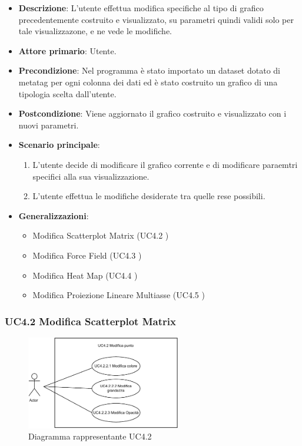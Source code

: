 \begin{itemize}
    \item \textbf{Descrizione}: L’utente effettua modifica specifiche al tipo di grafico precedentemente costruito e visualizzato, 
                                su parametri quindi validi solo per tale visualizzazone, e ne vede le modifiche.
	
    \item \textbf{Attore primario}: Utente.
    
    \item \textbf{Precondizione}:   Nel programma è stato importato un dataset dotato di metatag per ogni
                                    colonna dei dati ed è stato costruito un grafico di una tipologia scelta dall'utente.

    \item \textbf{Postcondizione}:  Viene aggiornato il grafico costruito e visualizzato con i nuovi parametri.

	\item \textbf{Scenario principale}:
		\begin{enumerate}
			\item L'utente decide di modificare il grafico corrente e di modificare paraemtri specifici alla sua visualizzazione.
			\item L'utente effettua le modifiche desiderate tra quelle rese possibili.
        \end{enumerate}
    \item \textbf{Generalizzazioni}:
        \begin{itemize}
            \item Modifica Scatterplot Matrix (UC4.2 )
            \item Modifica Force Field (UC4.3 )
            \item Modifica Heat Map (UC4.4 )
            \item Modifica Proiezione Lineare Multiasse (UC4.5 )
        \end{itemize}

\end{itemize}

\newpage
\subsubsection{UC4.2 Modifica Scatterplot Matrix}
\label{ssub:uc4.2}

\begin{figure}[h]
    \centering
    \includegraphics[width=0.6\textwidth]{componenti/casi-duso/diagrammi/UC4_2.pdf}
    \caption{Diagramma rappresentante UC4.2}
    \label{fig:UC4.2}
\end{figure}


